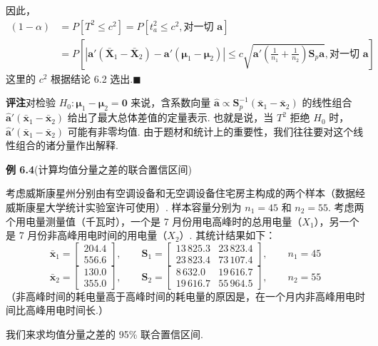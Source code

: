 因此，
\[
\begin{aligned}
(1-\alpha)&=P[T^2\leqslant c^2]=P[t_a^2\leqslant c^2,\text{对一切 }\boldsymbol{a}]\\
&=P\left[|\boldsymbol{a}'(\bar{\mathbf{X}}_1-\bar{\mathbf{X}}_2)-\boldsymbol{a}'(\boldsymbol{\mu}_1-\boldsymbol{\mu}_2)|\leqslant c\sqrt{\boldsymbol{a}'\left(\frac{1}{n_1}+\frac{1}{n_2}\right)\mathbf{S}_p\boldsymbol{a}},\text{对一切 }\boldsymbol{a}\right]
\end{aligned}
\]
这里的 $c^2$ 根据结论 6.2 选出.\hfill$\blacksquare$

\noindent\textbf{评注}\quad 对检验 $H_0: \boldsymbol{\mu}_1-\boldsymbol{\mu}_2=\mathbf{0}$ 来说，含系数向量 $\hat{\boldsymbol{a}}\propto\mathbf{S}_p^{-1}(\bar{\mathbf{x}}_1-\bar{\mathbf{x}}_2)$ 的线性组合 $\hat{\boldsymbol{a}}'(\bar{\mathbf{x}}_1-\bar{\mathbf{x}}_2)$ 给出了最大总体差值的定量表示. 也就是说，当 $T^2$ 拒绝 $H_0$ 时，$\hat{\boldsymbol{a}}'(\bar{\mathbf{x}}_1-\bar{\mathbf{x}}_2)$ 可能有非零均值. 由于题材和统计上的重要性，我们往往要对这个线性组合的诸分量作出解释.

\noindent\textbf{例 6.4}\quad (计算均值分量之差的联合置信区间)

考虑威斯康星州分别由有空调设备和无空调设备住宅房主构成的两个样本（数据经威斯康星大学统计实验室许可使用）. 样本容量分别为 $n_1=45$ 和 $n_2=55$. 考虑两个用电量测量值（千瓦时），一个是 7 月份用电高峰时的总用电量（$X_1$），另一个是 7 月份非高峰用电时间的用电量（$X_2$）. 其统计结果如下：
\[
\bar{\mathbf{x}}_1=\begin{bmatrix}204.4\\556.6\end{bmatrix},\qquad
\mathbf{S}_1=\begin{bmatrix}13\,825.3&23\,823.4\\23\,823.4&73\,107.4\end{bmatrix},\qquad n_1=45
\]
\[
\bar{\mathbf{x}}_2=\begin{bmatrix}130.0\\355.0\end{bmatrix},\qquad
\mathbf{S}_2=\begin{bmatrix}8\,632.0&19\,616.7\\19\,616.7&55\,964.5\end{bmatrix},\qquad n_2=55
\]
（非高峰时间的耗电量高于高峰时间的耗电量的原因是，在一个月内非高峰用电时间比高峰用电时间长.）

我们来求均值分量之差的 95\% 联合置信区间.

